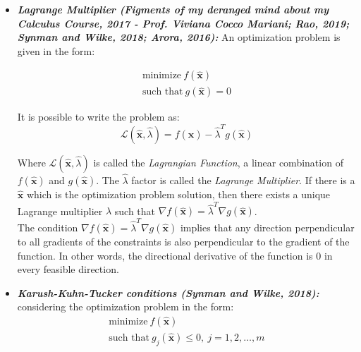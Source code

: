 \documentclass[conference]{IEEEtran}
\begin{document}
\begin{itemize}
	\item \textbf{\textit{Lagrange Multiplier (Figments of my deranged mind about my Calculus Course, 2017 - Prof. Viviana Cocco Mariani; Rao, 2019; Synman and Wilke, 2018; Arora, 2016):}} An optimization problem is given in the form:
	
	\begin{equation}
		\begin{split}
		\text{minimize}\ f(\hat{\mathbf{x}})\\
		\text{such that}\ g(\hat{\mathbf{x}}) = 0
		\end{split}
		\label{optimizationproblem01}
	\end{equation}
	
	It is possible to write the problem as:
	\begin{equation}
		\mathcal{L}(\hat{\mathbf{x}},\hat{\lambda}) = f(\hat{\mathbf{x}}) - \hat{\lambda}^T g(\hat{\mathbf{x}})
	\end{equation}
	
	Where $\mathcal{L}(\hat{\mathbf{x}},\hat{\lambda})$ is called the \textit{Lagrangian Function}, a linear combination of  $f(\hat{\mathbf{x}})$ and $g(\hat{\mathbf{x}})$. The $\hat{\lambda}$ factor is called the \textit{Lagrange Multiplier}. If there is a $\hat{\mathbf{x}}$ which is the optimization problem solution, then there exists a unique Lagrange multiplier $\hat{\lambda}$ such that $\nabla f(\hat{\mathbf{x}}) = \hat{\lambda}^{T}\nabla g(\hat{\mathbf{x}})$.
	\\
	The condition $\nabla f(\hat{\mathbf{x}}) = \hat{\lambda}^{T}\nabla g(\hat{\mathbf{x}})$ implies that any direction perpendicular to all gradients of the constraints is also perpendicular to the gradient of the function. In other words, the directional derivative of the function is 0 in every feasible direction.
	
	\item \textit{\textbf{Karush-Kuhn-Tucker conditions (Synman and Wilke, 2018): }} considering the optimization problem  in the form:
	 	\begin{equation}
	 	\begin{split}
	 		\text{minimize}\ f(\hat{\mathbf{x}})\\
	 		\text{such that}\ g_j(\hat{\mathbf{x}}) \leq 0, \ j = 1, 2, \hdots , m
	 	\end{split}
	 	\label{optimizationproblem02}
	 \end{equation}
 

\end{itemize}
\end{document}
